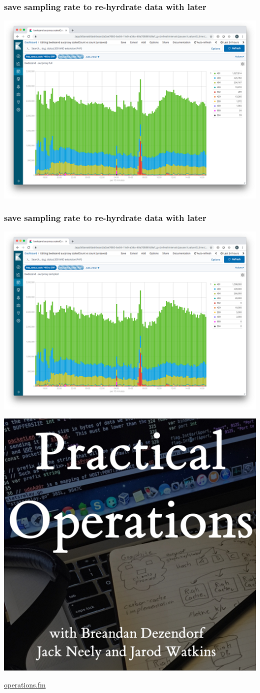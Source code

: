 \begin{frame}
    \frametitle{save sampling rate to re-hyrdrate data with later}
    \begin{center}
        \includegraphics[width=0.8\linewidth]{query-full.png}
    \end{center}
\end{frame}

\begin{frame}
    \frametitle{save sampling rate to re-hyrdrate data with later}
    \begin{center}
        \includegraphics[width=0.8\linewidth]{query-sampled.png}
    \end{center}
\end{frame}

\begin{frame}[standout]
    \begin{center}
        \includegraphics[width=0.5\linewidth]{cover-square.jpg}

        \href{https://operations.fm}{operations.fm}
    \end{center}
\end{frame}

